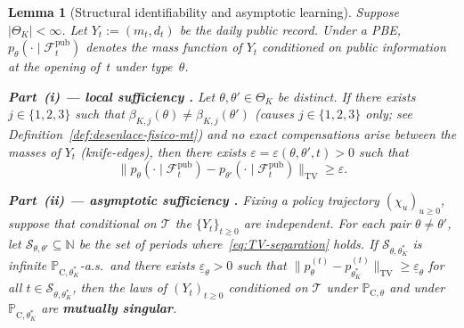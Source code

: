 \documentclass[ecta,nameyear,final,supplement]{econsocart}
\numberwithin{equation}{section}
\numberwithin{table}{section}
\newtheorem{lemma}[theorem]{Lemma}
\theoremstyle{definition}
\newcommand{\ProbC}[1]{\mathbb{P}_{\mathrm{C},#1}}
\begin{document}
\bigskip

\begin{lemma}[Structural identifiability and asymptotic learning]
\label{lem:hazard-separation}
Suppose $|\Theta_K|<\infty$. Let $Y_t:=(m_t,d_t)$ be the daily public record.
Under a PBE, $p_\theta(\cdot\mid\mathcal{F}_t^{\mathrm{pub}})$ denotes the
mass function of $Y_t$ conditioned on public information at the opening of~$t$
under type~$\theta$.

\smallskip
\noindent\textbf{Part~(i) --- local sufficiency
\citep{Cox1972,Bradburn2003}.}
Let $\theta,\theta'\in\Theta_K$ be distinct. If there exists $j\in\{1,2,3\}$ such that
$\beta_{K,j}(\theta)\neq\beta_{K,j}(\theta')$ (causes $j\in\{1,2,3\}$ only; see
Definition~\ref{def:desenlace-fisico-mt}) and no exact compensations arise
between the masses of $Y_t$ (\emph{knife-edges}),
then there exists $\varepsilon=\varepsilon(\theta,\theta',t)>0$ such that
\begin{equation}
\label{eq:TV-separation}
\bigl\|p_\theta(\cdot\mid\mathcal{F}_t^{\mathrm{pub}})
-p_{\theta'}(\cdot\mid\mathcal{F}_{t}^{\mathrm{pub}})\bigr\|_{\mathrm{TV}}
\ge\varepsilon.
\end{equation}

\smallskip
\noindent\textbf{Part~(ii) --- asymptotic sufficiency
\citep{Kakutani1948,Shiryaev2019Probability}.}
Fixing a policy trajectory $(\chi_u)_{u\ge 0}$, suppose that
conditional on $\mathcal{T}$ the $\{Y_t\}_{t\ge 0}$ are independent. For
each pair $\theta\neq\theta'$, let $\mathcal{S}_{\theta,\theta'}\subseteq\mathbb{N}$
be the set of periods where~\eqref{eq:TV-separation} holds. If
$\mathcal{S}_{\theta,\theta_K^\ast}$ is infinite $\ProbC{\theta_K^\ast}$-a.s.\
and there exists $\underline\varepsilon_\theta>0$ such that
$\|p_\theta^{(t)}-p_{\theta_K^\ast}^{(t)}\|_{\mathrm{TV}}
\ge\underline\varepsilon_\theta$ for all $t\in\mathcal{S}_{\theta,\theta_K^\ast}$,
then the laws of $(Y_t)_{t\ge 0}$ conditioned on $\mathcal{T}$ under
$\ProbC{\theta}$ and under $\ProbC{\theta_K^\ast}$ are
\textbf{mutually singular}.
\end{lemma}
\end{document}
